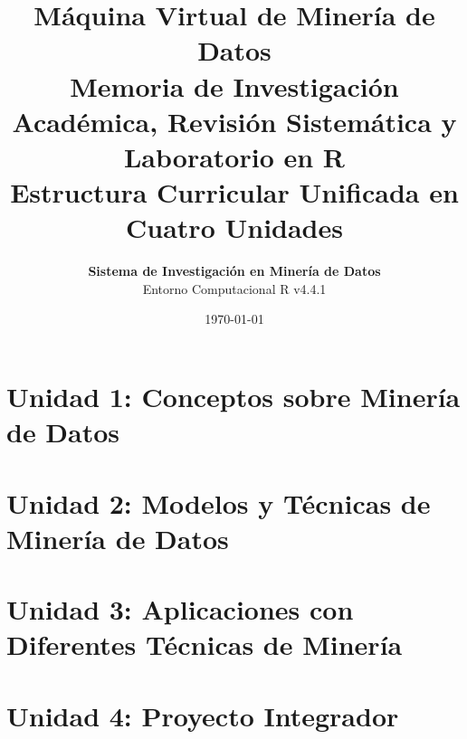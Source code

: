 \documentclass[12pt,a4paper]{report}
\title{\Huge \textbf{Máquina Virtual de Minería de Datos}\\
\Large \textbf{Memoria de Investigación Académica, Revisión Sistemática y Laboratorio en R}\\
\large Estructura Curricular Unificada en Cuatro Unidades}
\author{\textbf{Sistema de Investigación en Minería de Datos}\\Entorno Computacional R v4.4.1}
\date{\today}
\begin{document}
\maketitle
\tableofcontents
\listoffigures
\clearpage

\chapter{Unidad 1: Conceptos sobre Minería de Datos}








\chapter{Unidad 2: Modelos y Técnicas de Minería de Datos}







\chapter{Unidad 3: Aplicaciones con Diferentes Técnicas de Minería}








\chapter{Unidad 4: Proyecto Integrador}







\end{document}
